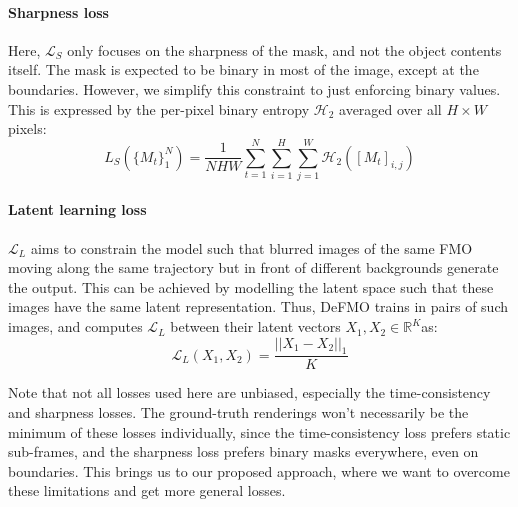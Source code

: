     \paragraph{Sharpness loss}
    Here, $\mathcal{L}_S$ only focuses on the sharpness of the mask, and not the object contents itself.
    The mask is expected to be binary in most of the image, except at the boundaries.
    However, we simplify this constraint to just enforcing binary values.
    This is expressed by the per-pixel binary entropy $\mathcal{H}_2$ averaged over all $H \times W$ pixels:
    \begin{equation}
        L_S({\{M_t\}}_1^N) =  \frac{1}{NHW} \sum_{t=1}^N \sum_{i=1}^H \sum_{j=1}^W \mathcal{H}_2({[M_t]}_{i,j})
    \end{equation}

    \paragraph{Latent learning loss}
    $\mathcal{L}_L$ aims to constrain the model such that blurred images of the same FMO moving along the same trajectory but in front of different backgrounds generate the output.
    This can be achieved by modelling the latent space such that these images have the same latent representation.
    Thus, DeFMO trains in pairs of such images, and computes $\mathcal{L}_L$ between their latent vectors $X_1, X_2 \in \mathbb{R}^K$as:
    \begin{equation}
        \mathcal{L}_L(X_1, X_2) = \frac{{|| X_1 - X_2 ||}_1}{K}
    \end{equation}

    Note that not all losses used here are unbiased, especially the time-consistency and sharpness losses.
    The ground-truth renderings won't necessarily be the minimum of these losses individually, since the time-consistency loss prefers static sub-frames, and the sharpness loss prefers binary masks everywhere, even on boundaries.
    This brings us to our proposed approach, where we want to overcome these limitations and get more general losses.
